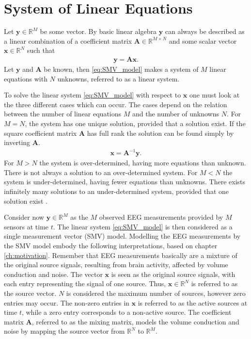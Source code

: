 \section{System of Linear Equations}\label{sec:SMV}
Let $\mathbf{y} \in \mathbb{R}^M$ be some vector. By basic linear algebra $\mathbf{y}$ can always be described as a linear combination of a coefficient matrix $\mathbf{A} \in \mathbb{R}^{M \times N}$ and some scalar vector $\mathbf{x} \in \mathbb{R}^N$ such that
\begin{align}\label{eq:SMV_model}
\mathbf{y} = \mathbf{Ax}.
\end{align}
Let $\mathbf{y}$ and $\mathbf{A}$ be known, then  
\eqref{eq:SMV_model} makes a system of $M$ linear equations with $N$ unknowns, referred to as a linear system. 

To solve the linear system \eqref{eq:SMV_model} with respect to $\textbf{x}$ one must look at the three different cases which can occur. 
The cases depend on the relation between the number of linear equations $M$ and the number of unknowns $N$.
For $M = N$, the system has one unique solution, provided that a solution exist. 
If the square coefficient matrix $\mathbf{A}$ has full rank the solution can be found simply by inverting $\mathbf{A}$.
\begin{align*}
\mathbf{x} = \mathbf{A}^{-1} \mathbf{y}.
\end{align*}
For $M > N$ the system is over-determined, having more equations than unknown. 
There is not always a solution to an over-determined system.   
For $M < N$ the system is under-determined, having fewer equations than unknowns. 
There exists infinitely many solutions to an under-determined system, provided that one solution exist \cite[p. ix]{CS}.  

Consider now $\mathbf{y} \in \mathbb{R}^M$ as the $M$ observed EEG measurements provided by $M$ sensors at time $t$. 
The linear system \eqref{eq:SMV_model} is then considered as a single measurement vector (SMV) model.  
Modelling the EEG measurements by the SMV model embody the following interpretations, based on chapter \ref{ch:motivation}.
Remember that EEG measurements basically are a mixture of the original source signals, resulting from brain activity, affected by volume conduction and noise.
The vector $\mathbf{x}$ is seen as the original source signals, with each entry representing the signal of one source. 
Thus, $\mathbf{x} \in \mathbb{R}^N$ is referred to as the source vector. 
$N$ is considered the maximum number of sources, however zero entries may occur. 
The non-zero entries in $\mathbf{x}$ is referred to as the active sources at time $t$, while a zero entry corresponds to a non-active source.   
The coefficient matrix $\mathbf{A}$, referred to as the mixing matrix, models the volume conduction and noise by mapping the source vector from $\mathbb{R}^N$ to $\mathbb{R}^M$.            

